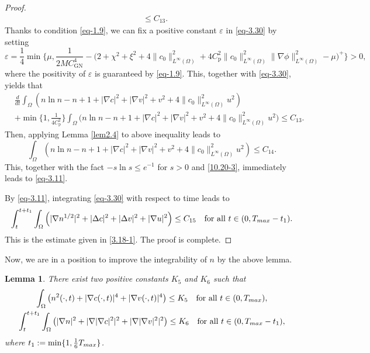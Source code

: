 \documentclass[10pt,a4paper]{amsart}
\numberwithin{equation}{section}
\newtheorem{lemma}[theo]{Lemma}
\begin{document}
\begin{proof}
\begin{equation}
\begin{aligned}
&\leq  C_{13}.
\end{aligned}
\end{equation}
Thanks to condition \eqref{eq-1.9}, we can fix a positive constant $\varepsilon$ 
in \eqref{eq-3.30} by setting
\[
\varepsilon = \frac{1}{4} \min \Big\{ \mu, \frac{1}{2 M C_{\mathrm{GN}}^4} 
- \Big(2 + \chi^2 + \xi^2 + 4\|c_0\|_{L^\infty(\Omega)}^2
 + 4 C_{\mathrm{p}}^2\|c_0\|_{L^\infty(\Omega)}^2 \|\nabla \phi\|_{L^\infty(\Omega)}^2 
 - \mu\Big)^+ \Big\}>0,
\]
where the positivity of $\varepsilon$ is guaranteed by \eqref{eq-1.9}. 
This, together with \eqref{eq-3.30}, yields that
\begin{align*}
&\frac{d}{dt} \int_{\Omega} \left( n \ln n - n + 1 + |\nabla c|^2 + |\nabla v|^2 + v^2+ 4\|c_0\|_{L^\infty(\Omega)}^2 u^2\right) \\
&+ \min\big\{ 1, \frac{1}{4 C^2_{\mathrm{p}}}\big\} 
\int_{\Omega} \Big(n \ln n - n + 1 + |\nabla c|^2 + |\nabla v|^2 + v^2
 + 4\|c_0\|_{L^\infty(\Omega)}^2 u^2\Big)
\leq C_{13}.
\end{align*}
Then, applying Lemma \ref{lem2.4} to above inequality leads to
\[
\int_\Omega \left(n \ln n - n + 1 + |\nabla c|^2 + |\nabla v|^2 + v^2
+ 4\|c_0\|_{L^\infty(\Omega)}^2 u^2\right)\leq C_{14}.
\]
This, together with the fact $-s\ln s\leq e^{-1}$ for $s>0$ and \eqref{10.20-3}, 
immediately leads to \eqref{eq-3.11}.

By  \eqref{eq-3.11}, integrating \eqref{eq-3.30} with respect to time leads to
\begin{equation} \label{3.18-2}
\int_{t}^{t+t_1}\int_{\Omega}\left(|\nabla n^{1/2}|^2
+|\Delta c|^2+|\Delta v|^2+|\nabla u|^2\right)
\le C_{15} \quad\text{for all } t\in(0,T_{\rm max}-t_1).
\end{equation}
This is the estimate given in \eqref{3.18-1}.
The proof is complete.
\end{proof}

Now, we are in a position to improve the integrability of $n$ by the above lemma.

\begin{lemma}\label{lem3.6}
There exist two positive constants $K_5$ and $K_6$ such that
\begin{gather}\label{eq-3.32}
\int_{\Omega} \left(n^2(\cdot, t)+| \nabla c(\cdot, t) |^4
+ | \nabla v(\cdot, t) |^4\right) \leq K_5 \quad\text{for all }
t \in (0, T_{\rm max}), \\
\label{1-18-2}
\int_t^{t+t_1}\int_{\Omega}\left(|\nabla n|^2+|\nabla |\nabla c|^2|^2
+|\nabla |\nabla v|^2|^2\right)\leq K_{6} \quad\text{for all } 
t \in (0, T_{\rm max}-t_1),
\end{gather}
where $t_1:=\min\{1,\frac{1}{6}T_{\rm max}\}$.
\end{lemma}
\end{document}
